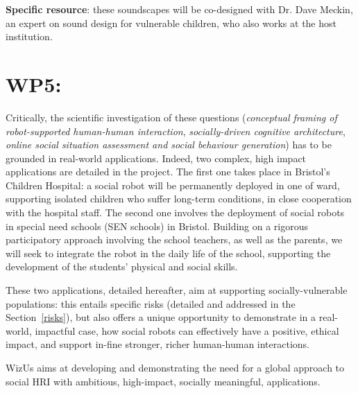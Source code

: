 \documentclass[11pt,a4paper]{report}
\newcommand{\project}{WizUs\xspace}
\begin{document}
\textbf{Specific resource}: these soundscapes will be co-designed with Dr.
Dave Meckin, an expert on sound design for vulnerable children, who also works
at the host institution.





\section{WP5: \textbf{\wpFive}}

\noindent{}





Critically, the scientific investigation of these questions (\emph{conceptual
framing of robot-supported human-human interaction}, \emph{socially-driven
cognitive architecture},  \emph{online social situation assessment and social
behaviour generation}) has to be
grounded in real-world applications. Indeed, two complex, high impact
applications are detailed in the project. The first one takes place in
Bristol's Children Hospital: a social robot will be permanently deployed in one
of ward, supporting isolated children who suffer long-term conditions, in close
cooperation with the hospital staff. The second one involves the deployment of 
social robots in special need schools (SEN schools) in Bristol. Building on a
rigorous participatory approach involving the school teachers, as well as the
parents, we will seek to integrate the robot in the daily life of the school,
supporting the development of the students' physical and social skills.

These two applications, detailed hereafter, aim at supporting
socially-vulnerable populations: this entails specific risks (detailed and
addressed in the Section~\ref{risks}), but also offers a unique opportunity to
demonstrate in a real-world, impactful case, how social robots can effectively
have a positive, ethical impact, and support in-fine stronger, richer
human-human interactions.


\project aims at developing and demonstrating the need for a global approach to
social HRI with ambitious, high-impact, socially meaningful, applications.
\end{document}
